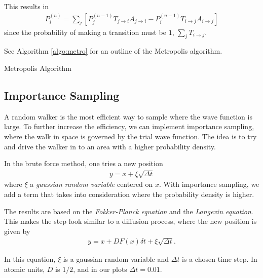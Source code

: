 \documentclass[twocolumns, a4paper,11pt,fleqn]{extarticle}
\newcommand{\eq}[1]{{\small\begin{align*}#1\end{align*}}}
\begin{document}
This results in
\eq{
  P_{i}^{(n)} = 
  \sum_j \left[
  P_{j}^{(n-1)} T_{j\rightarrow i} A_{j\rightarrow i}-
  P_{i}^{(n-1)} T_{i\rightarrow j} A_{i\rightarrow j}
  \right]
}
since the probability of making a transition must be $1$, $\sum_j T_{i\rightarrow j}$.


See Algorithm \ref{algo:metro} for an outline of the Metropolis algorithm.

\begin{algorithm}[H]
	\caption{Metropolis Algorithm}\label{algo:metro}
  \begin{algorithmic}[1]
    \EndProcedure
  \end{algorithmic}
\end{algorithm}

\subsection{Importance Sampling}
A random walker is the most efficient way to sample where the
wave function is large. To further increase the efficiency, we can implement importance
sampling, where the walk in space is governed by the trial wave function.
The idea is to try and drive the walker in to an area with a higher probability
density.

In the brute force method, one tries a new position
\eq{
  y = x + \xi \sqrt{\Delta t}
}
where $\xi$ a \textit{gaussian random variable} centered on $x$.
With importance sampling, we add a term that takes into consideration
where the probability density is higher.

The results are based on the 
\textit{Fokker-Planck equation} and the \textit{Langevin 
equation}. This makes the step look similar to a diffusion process,
where the new position is given by
\begin{align*}
y = x + DF(x) \delta t + \xi \sqrt{\Delta t}.
\end{align*}

In this equation, $\xi $ is a gaussian random variable 
and $\Delta t$ is a chosen time step.
In atomic units, $D$ is $1/2$, and in our plots $\Delta t = 0.01$. 
\end{document}
